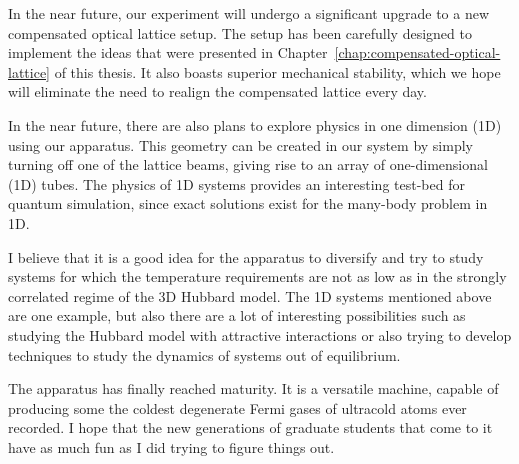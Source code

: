 \documentclass[twoside,11pt]{memoir}
\begin{document}
In the near future, our experiment will undergo a significant upgrade to a new
compensated optical lattice setup.   The setup has been carefully designed to
implement the ideas that were presented in
Chapter~\ref{chap:compensated-optical-lattice} of this thesis.   It also boasts
superior mechanical stability, which we hope will eliminate the need to realign
the compensated lattice every day. 

In the near future, there are also plans to explore physics in one dimension
(1D) using our apparatus. This geometry can be created in our system by simply
turning off one of the lattice beams, giving rise to an array of
one-dimensional (1D) tubes.   The physics of 1D systems provides an interesting
test-bed for quantum simulation, since exact solutions exist for the many-body
problem in 1D.  

I believe that it is a good idea for the apparatus to diversify and try to study
systems for which the temperature requirements are not as low as in the
strongly correlated regime of the 3D Hubbard model.   The 1D systems mentioned
above are one example,  but also there are a lot of interesting possibilities
such as studying the Hubbard model with attractive interactions or also trying
to develop techniques to study the dynamics of systems out of equilibrium.   

The apparatus has finally reached maturity. It is a versatile machine, capable
of producing some the coldest degenerate Fermi gases of ultracold atoms ever
recorded.  I hope that the new generations of graduate students that come to it
have as much fun as I did trying to figure things out.  



\appendix
 

%



%
%
%

\end{document}

